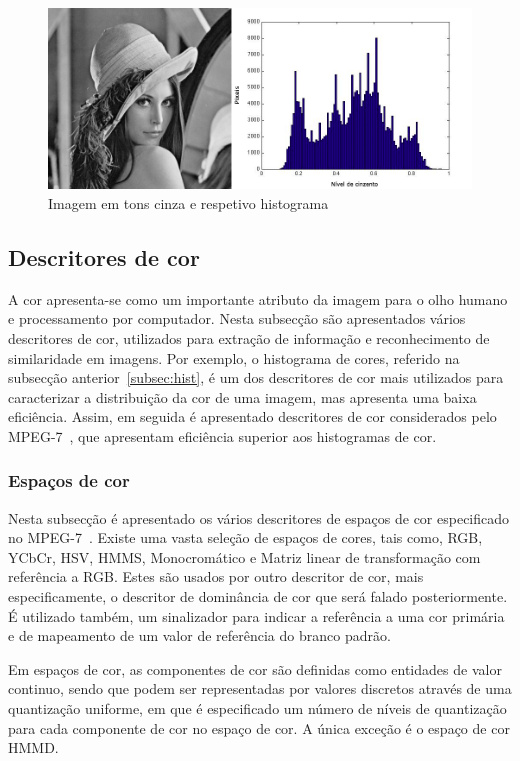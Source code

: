 \begin{figure}[h]
\centering
\includegraphics[width=0.8\linewidth]{./figures/histlena}
\caption{Imagem em tons cinza e respetivo histograma }
\label{fig:lenahist}
\end{figure}

\subsection{Descritores de cor}

A cor apresenta-se como um importante atributo da imagem para o olho humano e processamento por computador. Nesta subsecção são apresentados vários descritores de cor, utilizados para extração de informação e reconhecimento de similaridade em imagens. Por exemplo, o histograma de cores, referido na subsecção anterior~\ref{subsec:hist}, é um dos descritores de cor mais utilizados para caracterizar a distribuição da cor de uma imagem, mas apresenta uma baixa eficiência. Assim, em seguida é apresentado descritores de cor considerados pelo MPEG-7~\cite{Manjunath2001, Christopoulos2000, Cieplinski2001, Ite-vil}, que apresentam eficiência superior aos histogramas de cor.


\subsubsection{Espaços de cor} \label{subsubsec:space}

Nesta subsecção é apresentado os vários descritores de espaços de cor especificado no MPEG-7~\cite{Ite-vil}. Existe uma vasta seleção de espaços de cores, tais como, RGB, YCbCr, HSV, HMMS, Monocromático e Matriz linear de transformação com referência a RGB. Estes são usados por outro descritor de cor, mais especificamente, o descritor de dominância de cor que será falado posteriormente. É utilizado também, um sinalizador para indicar a referência a uma cor primária e de mapeamento de um valor de referência do branco padrão. 

Em espaços de cor, as componentes de cor são definidas como entidades de valor continuo, sendo que podem ser representadas por valores discretos através de uma quantização uniforme, em que é especificado um número de níveis de quantização para cada componente de cor no espaço de cor. A única exceção é o espaço de cor HMMD.

